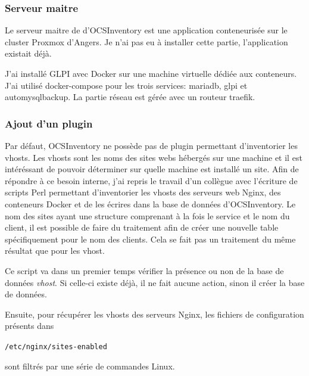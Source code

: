 \documentclass[12pt]{article}
\begin{document}
\newpage
\subsubsection{Serveur maitre}
Le serveur maitre de d'\gls{OCSInventory} est une application conteneurisée sur le \gls{cluster} \gls{Proxmox} d'Angers.
Je n'ai pas eu à installer cette partie, l'application existait déjà.

J'ai installé \gls{GLPI} avec Docker sur une machine virtuelle dédiée aux conteneurs.
J'ai utilisé docker-compose pour les trois services: mariadb, glpi et automysqlbackup.
La partie réseau est gérée avec un routeur traefik.

\subsubsection{Ajout d'un plugin}
Par défaut, \gls{OCSInventory} ne possède pas de plugin permettant d'inventorier les vhosts. 
Les vhosts sont les noms des sites webs hébergés sur une machine et il est intéréssant de pouvoir déterminer sur quelle machine est installé un site. 
Afin de répondre à ce besoin interne, j'ai repris le travail d'un collègue avec l'écriture de scripts Perl permettant d'inventorier les vhosts des serveurs web Nginx, des conteneurs Docker et de les écrires dans la base de données d'\gls{OCSInventory}.
Le nom des sites ayant une structure comprenant à la fois le service et le nom du client, il est possible de faire du traitement afin de créer une nouvelle table spécifiquement pour le nom des clients.
Cela se fait pas un traitement du même résultat que pour les vhost.

Ce script va dans un premier temps vérifier la présence ou non de la base de données \textit{vhost}.
Si celle-ci existe déjà, il ne fait aucune action, sinon il créer la base de données.

Ensuite, pour récupérer les vhosts des serveurs Nginx, les fichiers de configuration présents dans \begin{code} \texttt{/etc/nginx/sites-enabled}\end{code} sont filtrés par une série de commandes \gls{Linux}.
\end{document}
